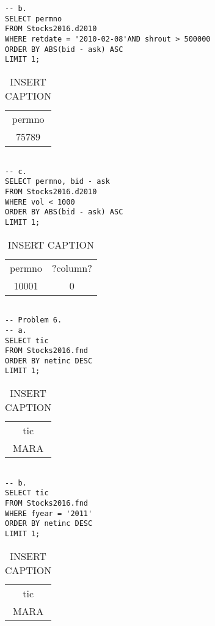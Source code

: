\documentclass[12 pt]{article}
\begin{document}
\begin{flushleft}
\begin{verbatim}
-- b. 
SELECT permno
FROM Stocks2016.d2010
WHERE retdate = '2010-02-08'AND shrout > 500000
ORDER BY ABS(bid - ask) ASC
LIMIT 1; 
 \end{verbatim} 
\begin{table}[h] 
\centering 
\caption{INSERT CAPTION} 
\label{my - label} 
\begin{tabular}{c } 
\\
permno\\
75789\\
\end{tabular} 
 \end{table} \begin{verbatim} 

-- c.
SELECT permno, bid - ask
FROM Stocks2016.d2010
WHERE vol < 1000
ORDER BY ABS(bid - ask) ASC
LIMIT 1; 
 \end{verbatim} 
\begin{table}[h] 
\centering 
\caption{INSERT CAPTION} 
\label{my - label} 
\begin{tabular}{c c } 
\\
permno & ?column?\\
10001 & 0\\
\end{tabular} 
 \end{table} \begin{verbatim} 

-- Problem 6.
-- a.
SELECT tic
FROM Stocks2016.fnd
ORDER BY netinc DESC
LIMIT 1; 
 \end{verbatim} 
\begin{table}[h] 
\centering 
\caption{INSERT CAPTION} 
\label{my - label} 
\begin{tabular}{c } 
\\
tic\\
MARA\\
\end{tabular} 
 \end{table} \begin{verbatim} 

-- b. 
SELECT tic
FROM Stocks2016.fnd
WHERE fyear = '2011'
ORDER BY netinc DESC
LIMIT 1; 
 \end{verbatim} 
\begin{table}[h] 
\centering 
\caption{INSERT CAPTION} 
\label{my - label} 
\begin{tabular}{c } 
 \\
tic\\
MARA\\
\end{tabular} 
 \end{table} \begin{verbatim} 


\end{verbatim}
\end{flushleft}
\end{document}

